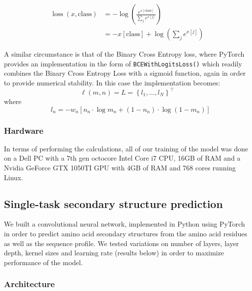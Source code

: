 \begin{multicols}{2}
\begin{align*}
\operatorname{loss}(x, \text {class})&=-\log \left(\frac{e^{ x[\text {class}]}}{\sum_{j} e^{ x[j]}}\right)\\
&=-x[\text {class}]+\log \left(\sum_{j} e^{x[j]}\right)
\end{align*}

\noindent A similar circumstance is that of the Binary Cross Entropy loss, where PyTorch provides an implementation in the form of \texttt{BCEWithLogitsLoss()} which readily combines the Binary Cross Entropy Loss with a sigmoid function, again in order to provide numerical stability. In this case the implementation becomes: \\
\[
\ell(m, n)=L=\left\{l_{1}, \ldots, l_{N}\right\}^{\top}
\]
where
\[ \quad l_{n}=-w_{n}\left[n_{n} \cdot \log m_{n}+\left(1-n_{n}\right) \cdot \log \left(1-m_{n}\right)\right]
\]

\subsubsection{Hardware}
In terms of performing the calculations, all of our training of the model was done on a Dell PC with a 7th gen octocore Intel Core i7 CPU, 16GB of RAM and a Nvidia GeForce GTX 1050TI GPU with 4GB of RAM and 768 cores running Linux.

\subsection{Single-task secondary structure prediction}
We built a convolutional neural network, implemented in Python using PyTorch in order to predict amino acid secondary structures from the amino acid residues as well as the sequence profile. We tested variations on number of layers, layer depth, kernel sizes and learning rate (results below) in order to maximize performance of the model. 

\subsubsection{Architecture}


\end{multicols}
